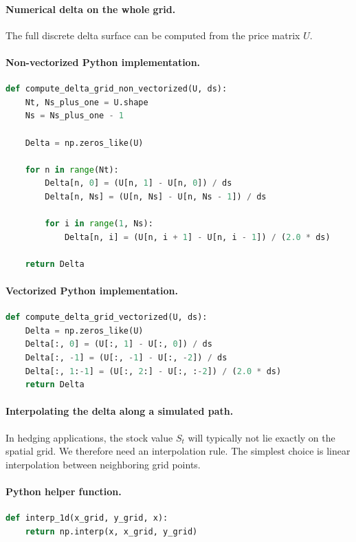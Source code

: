 \documentclass[11pt]{article}
\theoremstyle{plain}
\theoremstyle{definition}
\theoremstyle{remark}
\begin{document}
\paragraph{Numerical delta on the whole grid.}
The full discrete delta surface can be computed from the price matrix
\(U\).

\paragraph{Non-vectorized Python implementation.}
\begin{lstlisting}[language=Python]
def compute_delta_grid_non_vectorized(U, ds):
    Nt, Ns_plus_one = U.shape
    Ns = Ns_plus_one - 1

    Delta = np.zeros_like(U)

    for n in range(Nt):
        Delta[n, 0] = (U[n, 1] - U[n, 0]) / ds
        Delta[n, Ns] = (U[n, Ns] - U[n, Ns - 1]) / ds

        for i in range(1, Ns):
            Delta[n, i] = (U[n, i + 1] - U[n, i - 1]) / (2.0 * ds)

    return Delta
\end{lstlisting}

\paragraph{Vectorized Python implementation.}
\begin{lstlisting}[language=Python]
def compute_delta_grid_vectorized(U, ds):
    Delta = np.zeros_like(U)
    Delta[:, 0] = (U[:, 1] - U[:, 0]) / ds
    Delta[:, -1] = (U[:, -1] - U[:, -2]) / ds
    Delta[:, 1:-1] = (U[:, 2:] - U[:, :-2]) / (2.0 * ds)
    return Delta
\end{lstlisting}

\paragraph{Interpolating the delta along a simulated path.}
In hedging applications, the stock value \(S_t\) will typically not lie
exactly on the spatial grid.
We therefore need an interpolation rule.
The simplest choice is linear interpolation between neighboring grid
points.

\paragraph{Python helper function.}
\begin{lstlisting}[language=Python]
def interp_1d(x_grid, y_grid, x):
    return np.interp(x, x_grid, y_grid)
\end{lstlisting}
\end{document}
